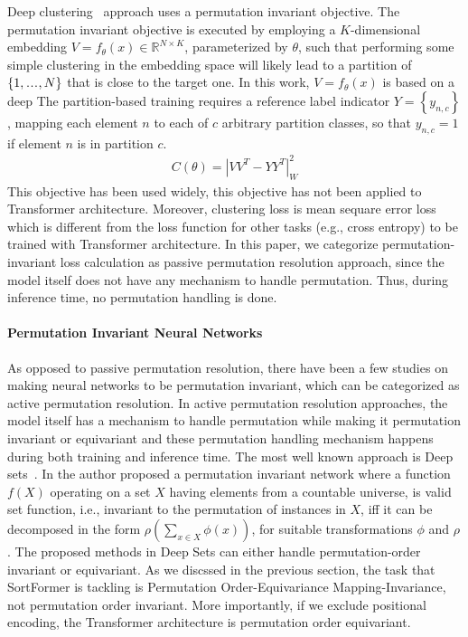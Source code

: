 \documentclass{article}
\newcommand\sdots{\makebox[1em][c]{.\hfil.\hfil.}}
\begin{document}
Deep clustering~\cite{hershey2016deep} approach uses a permutation invariant objective.
The permutation invariant objective is executed by employing a $K$-dimensional embedding $V=f_\theta(x) \in \mathbb{R}^{N \times K}$, parameterized by $\theta$, such that performing some
simple clustering in the embedding space will likely lead to a partition of $\{1, \sdots, N\}$ that is close to the target one. In this work, $V=f_\theta(x)$ is based on a deep
The partition-based training requires a reference label indicator $Y=\left\{y_{n, c}\right\}$, mapping each element $n$ to each of $c$ arbitrary partition classes, so that $y_{n, c}=1$
if element $n$ is in partition $c$.
\begin{align}
  C(\theta)=\left|V V^T-Y Y^T\right|_W^2
\end{align}
This objective has been used widely, this objective has not been applied to Transformer architecture.
Moreover, clustering loss is mean sequare error loss which is different from the loss function for other tasks (e.g., cross entropy) to be trained with Transformer architecture.
In this paper, we categorize permutation-invariant loss calculation as passive permutation resolution approach, since the model itself does not have any mechanism to handle permutation.
Thus, during inference time, no permutation handling is done.


\paragraph{Permutation Invariant Neural Networks}
As opposed to passive permutation resolution, there have been a few studies on making neural networks to be permutation invariant, which can be categorized as active permutation resolution.
In active permutation resolution approaches, the model itself has a mechanism to handle permutation while making it permutation invariant or equivariant and these permutation handling mechanism happens
during both training and inference time.
The most well known approach is Deep sets~\cite{zaheer2017deep}.
In \cite{zaheer2017deep} the author proposed a permutation invariant network where a function $f(X)$ operating on a set $X$ having elements from a countable universe, is valid set function,
i.e., invariant to the permutation of instances in $X$,
iff it can be decomposed in the form $\rho\left(\sum_{x \in X} \phi(x)\right)$, for suitable transformations $\phi$ and $\rho$.
The proposed methods in Deep Sets can either handle permutation-order invariant or equivariant. 
As we discssed in the previous section, the task that SortFormer is tackling is Permutation Order-Equivariance Mapping-Invariance, not permutation order invariant.
More importantly, if we exclude positional encoding, the Transformer architecture is permutation order equivariant.
\end{document}
